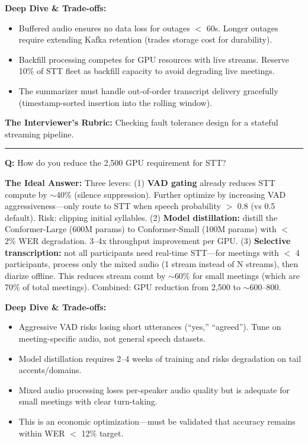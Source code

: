 \textbf{Deep Dive \& Trade-offs:}
\begin{itemize}
  \item Buffered audio ensures no data loss for outages $<$ 60s. Longer outages require extending Kafka retention (trades storage cost for durability).
  \item Backfill processing competes for GPU resources with live streams. Reserve 10\% of STT fleet as backfill capacity to avoid degrading live meetings.
  \item The summarizer must handle out-of-order transcript delivery gracefully (timestamp-sorted insertion into the rolling window).
\end{itemize}

\textbf{The Interviewer's Rubric:} Checking fault tolerance design for a stateful streaming pipeline.

\bigskip\hrule\bigskip

\textbf{Q:} How do you reduce the 2,500 GPU requirement for STT?

\textbf{The Ideal Answer:} Three levers: (1) \textbf{VAD gating} already reduces STT compute by $\sim$40\% (silence suppression). Further optimize by increasing VAD aggressiveness---only route to STT when speech probability $>$ 0.8 (vs 0.5 default). Risk: clipping initial syllables. (2) \textbf{Model distillation:} distill the Conformer-Large (600M params) to Conformer-Small (100M params) with $<$ 2\% WER degradation. 3--4x throughput improvement per GPU. (3) \textbf{Selective transcription:} not all participants need real-time STT---for meetings with $<$ 4 participants, process only the mixed audio (1 stream instead of N streams), then diarize offline. This reduces stream count by $\sim$60\% for small meetings (which are 70\% of total meetings). Combined: GPU reduction from 2,500 to $\sim$600--800.

\textbf{Deep Dive \& Trade-offs:}
\begin{itemize}
  \item Aggressive VAD risks losing short utterances (``yes,'' ``agreed''). Tune on meeting-specific audio, not general speech datasets.
  \item Model distillation requires 2--4 weeks of training and risks degradation on tail accents/domains.
  \item Mixed audio processing loses per-speaker audio quality but is adequate for small meetings with clear turn-taking.
  \item This is an economic optimization---must be validated that accuracy remains within WER $<$ 12\% target.
\end{itemize}

